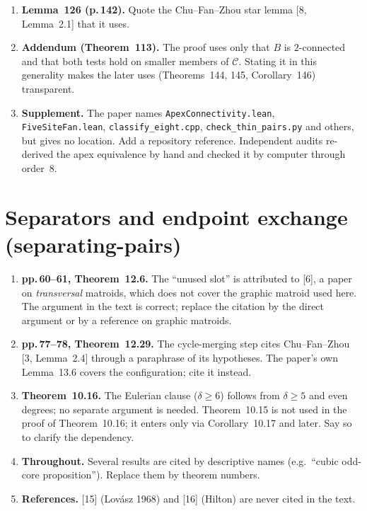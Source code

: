 \documentclass[11pt]{amsart}
\begin{document}
\begin{enumerate}
and publish the certificate files. Two structural seven-site shapes (a diamond, or $K_4$ joined by a bridge
to a triangle) use Fan--Hou--Zhou, which should be cited at that point.
\item \textbf{Lemma~126 (p.\,142).} Quote the Chu--Fan--Zhou star lemma [8, Lemma~2.1] that it uses.
\item \textbf{Addendum (Theorem~113).} The proof uses only that $B$ is $2$-connected and that both tests
hold on smaller members of $\mathcal C$. Stating it in this generality makes the later uses
(Theorems~144, 145, Corollary~146) transparent.
\item \textbf{Supplement.} The paper names \texttt{ApexConnectivity.lean}, \texttt{FiveSiteFan.lean},
\texttt{classify\_eight.cpp}, \texttt{check\_thin\_pairs.py} and others, but gives no location. Add a
repository reference. Independent audits re-derived the apex equivalence by hand and checked it by
computer through order~$8$.
\end{enumerate}

\section{Separators and endpoint exchange (separating-pairs)}

\begin{enumerate}
\item \textbf{pp.\,60--61, Theorem~12.6.} The ``unused slot'' is attributed to [6], a paper on
\emph{transversal} matroids, which does not cover the graphic matroid used here. The argument in the
text is correct; replace the citation by the direct argument or by a reference on graphic matroids.
\item \textbf{pp.\,77--78, Theorem~12.29.} The cycle-merging step cites Chu--Fan--Zhou [3, Lemma~2.4]
through a paraphrase of its hypotheses. The paper's own Lemma~13.6 covers the configuration; cite it
instead.
\item \textbf{Theorem~10.16.} The Eulerian clause ($\delta\ge6$) follows from $\delta\ge5$ and even
degrees; no separate argument is needed. Theorem~10.15 is not used in the proof of Theorem~10.16; it
enters only via Corollary~10.17 and later. Say so to clarify the dependency.
\item \textbf{Throughout.} Several results are cited by descriptive names (e.g.\ ``cubic odd-core
proposition''). Replace them by theorem numbers.
\item \textbf{References.} [15] (Lov\'asz 1968) and [16] (Hilton) are never cited in the text.
\end{enumerate}
\end{document}
